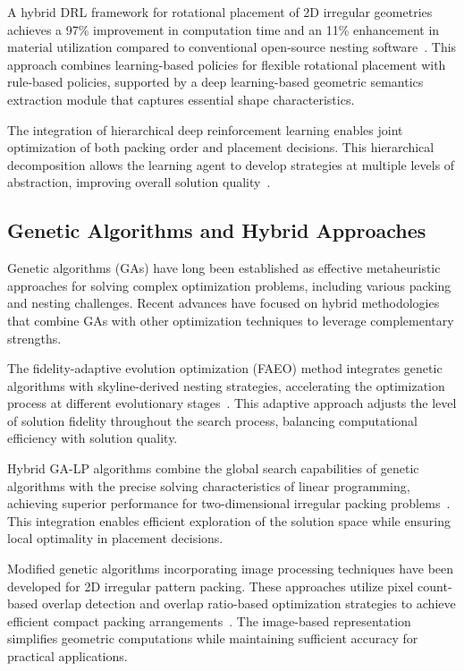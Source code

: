 \documentclass[12pt]{article}
\begin{document}
A hybrid DRL framework for rotational placement of 2D irregular geometries achieves a 97\% improvement in computation time and an 11\% enhancement in material utilization compared to conventional open-source nesting software~\cite{nest_smarter2025}. This approach combines learning-based policies for flexible rotational placement with rule-based policies, supported by a deep learning-based geometric semantics extraction module that captures essential shape characteristics.

The integration of hierarchical deep reinforcement learning enables joint optimization of both packing order and placement decisions. This hierarchical decomposition allows the learning agent to develop strategies at multiple levels of abstraction, improving overall solution quality~\cite{ml_hierarchical2024}.

\subsection{Genetic Algorithms and Hybrid Approaches}

Genetic algorithms (GAs) have long been established as effective metaheuristic approaches for solving complex optimization problems, including various packing and nesting challenges. Recent advances have focused on hybrid methodologies that combine GAs with other optimization techniques to leverage complementary strengths.

The fidelity-adaptive evolution optimization (FAEO) method integrates genetic algorithms with skyline-derived nesting strategies, accelerating the optimization process at different evolutionary stages~\cite{faeo2024}. This adaptive approach adjusts the level of solution fidelity throughout the search process, balancing computational efficiency with solution quality.

Hybrid GA-LP algorithms combine the global search capabilities of genetic algorithms with the precise solving characteristics of linear programming, achieving superior performance for two-dimensional irregular packing problems~\cite{ga_lp2023}. This integration enables efficient exploration of the solution space while ensuring local optimality in placement decisions.

Modified genetic algorithms incorporating image processing techniques have been developed for 2D irregular pattern packing. These approaches utilize pixel count-based overlap detection and overlap ratio-based optimization strategies to achieve efficient compact packing arrangements~\cite{ga_image2025}. The image-based representation simplifies geometric computations while maintaining sufficient accuracy for practical applications.
\end{document}
